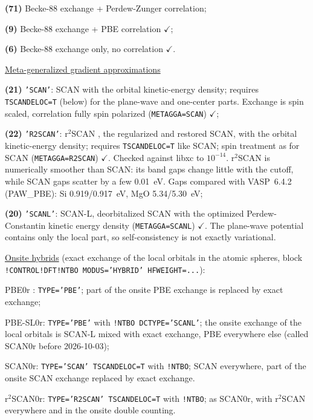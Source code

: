 \documentclass[final,12pt]{article}
\begin{document}
{{    {\bf(71)} Becke-88 exchange + Perdew-Zunger correlation;

    {\bf(9)} Becke-88 exchange + PBE correlation $\checkmark$;

    {\bf(6)} Becke-88 exchange only, no correlation $\checkmark$.

    \underline{Meta-generalized gradient approximations}

    {\bf(21)} {\tt 'SCAN'}: SCAN \cite{sun15_prl115_036402} with the
    orbital kinetic-energy density; requires {\tt TSCANDELOC=T} (below)
    for the plane-wave and one-center parts. Exchange is spin scaled,
    correlation fully spin polarized ({\tt METAGGA=SCAN}) $\checkmark$;

    {\bf(22)} {\tt 'R2SCAN'}: r$^2$SCAN \cite{furness20_jpcl11_8208},
    the regularized and restored SCAN, with the orbital kinetic-energy
    density; requires {\tt TSCANDELOC=T} like SCAN; spin treatment as for
    SCAN ({\tt METAGGA=R2SCAN}) $\checkmark$. Checked against libxc to
    $10^{-14}$. r$^2$SCAN is numerically smoother than SCAN: its band gaps
    change little with the cutoff, while SCAN gaps scatter by a few
    0.01~eV. Gaps compared with VASP~6.4.2 (PAW\_PBE): Si 0.919/0.917~eV,
    MgO 5.34/5.30~eV;

    {\bf(20)} {\tt 'SCANL'}: SCAN-L, deorbitalized SCAN
    \cite{mejia17_pra96_052512} with the optimized Perdew-Constantin
    kinetic energy density \cite{perdew07_prb75_155109}
    ({\tt METAGGA=SCANL}) $\checkmark$. The plane-wave potential contains
    only the local part, so self-consistency is not exactly variational.

    \underline{Onsite hybrids} (exact exchange of the local orbitals in the
    atomic spheres, block {\tt !CONTROL!DFT!NTBO MODUS='HYBRID'
    HFWEIGHT=...}):

    PBE0r \cite{sotoudeh17_prb95_235150}: {\tt TYPE='PBE'}; part of the
    onsite PBE exchange is replaced by exact exchange;

    PBE-SL0r: {\tt TYPE='PBE'} with {\tt !NTBO DCTYPE='SCANL'}; the onsite
    exchange of the local orbitals is SCAN-L mixed with exact exchange,
    PBE everywhere else (called SCAN0r before 2026-10-03);

    SCAN0r: {\tt TYPE='SCAN' TSCANDELOC=T} with {\tt !NTBO}; SCAN
    everywhere, part of the onsite SCAN exchange replaced by exact
    exchange.

    r$^2$SCAN0r: {\tt TYPE='R2SCAN' TSCANDELOC=T} with {\tt !NTBO}; as
    SCAN0r, with r$^2$SCAN everywhere and in the onsite double counting.

}}
\end{document}
